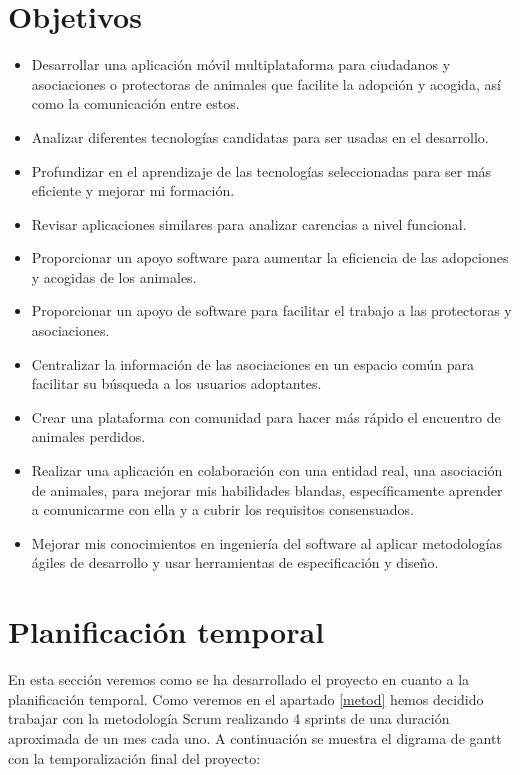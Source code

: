 \section{Objetivos}

\begin{itemize}
	\item Desarrollar una aplicación móvil multiplataforma para ciudadanos y asociaciones o protectoras de animales que facilite la adopción y acogida, así como la comunicación entre estos. %
	\item Analizar diferentes tecnologías candidatas para ser usadas en el desarrollo.
	\item Profundizar en el aprendizaje de las tecnologías seleccionadas para ser más eficiente y mejorar mi formación.
	\item Revisar aplicaciones similares para analizar carencias a nivel funcional. %
	\item Proporcionar un apoyo software para aumentar la eficiencia de las adopciones y acogidas de los animales. %
	\item Proporcionar un apoyo de software para facilitar el trabajo a las protectoras y asociaciones.
	\item Centralizar la información de las asociaciones en un espacio común para facilitar su búsqueda a los usuarios adoptantes.
	\item Crear una plataforma con comunidad para hacer más rápido el encuentro de animales perdidos.
	\item Realizar una aplicación en colaboración con una entidad real, una asociación de animales, para mejorar mis habilidades blandas, específicamente aprender a comunicarme con ella y a cubrir los requisitos consensuados.
	\item Mejorar mis conocimientos en ingeniería del software al aplicar metodologías ágiles de desarrollo y usar herramientas de especificación y diseño.
	
\end{itemize}

\section{Planificación temporal}
En esta sección veremos como se ha desarrollado el proyecto en cuanto a la planificación temporal. Como veremos en el apartado \ref{metod} hemos decidido trabajar con la metodología Scrum realizando 4 sprints de una duración aproximada de un mes cada uno. A continuación se muestra el digrama de gantt con la temporalización final del proyecto:

